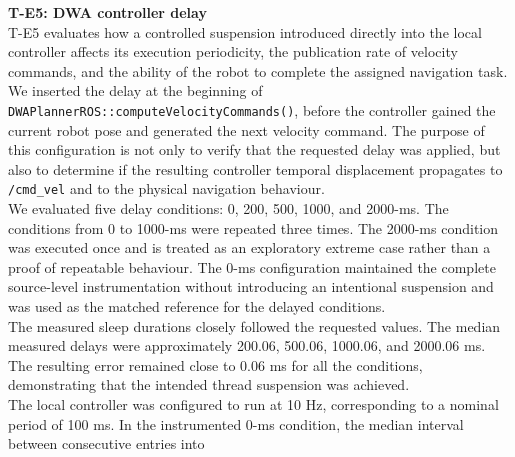 \noindent \textbf{T-E5: DWA controller delay} \\
T-E5 evaluates how a controlled suspension introduced directly into the local controller affects its execution periodicity, the publication rate of velocity commands, and the ability of the robot to complete the assigned navigation task. We inserted the delay at the beginning of \texttt{DWAPlannerROS::computeVelocityCommands()}, before the controller gained the current robot pose and generated the next velocity command. The purpose of this configuration is not only to verify that the requested delay was applied, but also to determine if the resulting controller temporal displacement propagates to \texttt{/cmd\_vel} and to the physical navigation behaviour.
\\
We evaluated five delay conditions: 0, 200, 500, 1000, and 2000-ms. The conditions from 0 to 1000-ms were repeated three times. The 2000-ms condition was executed once and is treated as an exploratory extreme case rather than a proof of repeatable behaviour. The 0-ms configuration maintained the complete source-level instrumentation without introducing an intentional suspension and was used as the matched reference for the delayed conditions.
\\
The measured sleep durations closely followed the requested values. The median measured delays were approximately 200.06, 500.06, 1000.06, and 2000.06 ms. The resulting error remained close to 0.06 ms for all the conditions, demonstrating that the intended thread suspension was achieved.
\\
The local controller was configured to run at 10 Hz, corresponding to a nominal period of 100 ms. In the instrumented 0-ms condition, the median interval between consecutive entries into 

